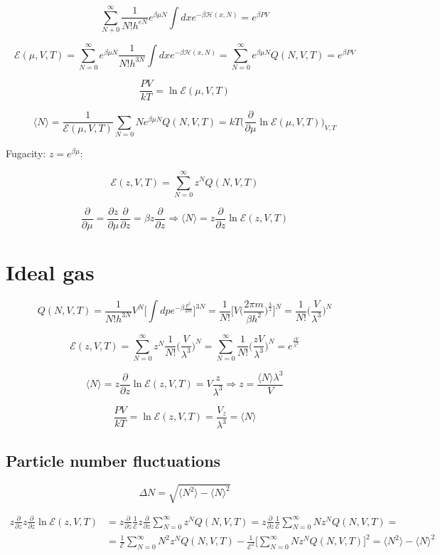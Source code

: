 	$$\sum\limits_{N+0}^{\infty}\frac{1}{N!h^{eN}}e^{\beta\mu N}\int dxe^{-\beta\mathcal{H}(x, N)} = e^{\beta PV}$$

	$$\mathcal{E}(\mu, V, T) = \sum\limits_{N=0}^{\infty}e^{\beta\mu N}\frac{1}{N!h^{3N}}\int dxe^{-\beta\mathcal{H}(x, N)} = \sum\limits_{N=0}^{\infty}e^{\beta\mu N}Q(N, V, T) = e^{\beta PV}$$

	$$\frac{PV}{kT} = \ln\mathcal{E}(\mu, V, T)$$

	$$\langle N\rangle = \frac{1}{\mathcal{E}(\mu, V, T)}\sum\limits_{N=0}Ne^{\beta\mu N}Q(N, V, T) = kT\biggl(\frac{\partial}{\partial\mu}\ln\mathcal{E}(\mu, V, T)\biggr)_{V, T}$$

	Fugacity: $z = e^{\beta\mu}$:

	$$\mathcal{E}(z, V, T) = \sum\limits_{N=0}^{\infty}z^NQ(N, V, T)$$

	$$\frac{\partial}{\partial\mu} = \frac{\partial z}{\partial\mu}\frac{\partial}{\partial z} = \beta z\frac{\partial}{\partial z}\Rightarrow\langle N\rangle = z\frac{\partial}{\partial z}\ln\mathcal{E}(z, V, T)$$

\section{Ideal gas}

$$Q(N, V, T) = \frac{1}{N!h^{3N}}V^N\biggl[\int dpe^{-\beta\frac{p^2}{2m}}\biggr]^{3N} = \frac{1}{N!}\biggl[V\biggl(\frac{2\pi m}{\beta h^2}\biggr)^{\frac{3}{2}}\biggr]^{N} = \frac{1}{N!}\biggl(\frac{V}{\lambda^3}\biggr)^N$$

$$\mathcal{E}(z, V, T) = \sum\limits_{N=0}^{\infty}z^N\frac{1}{N!}\biggl(\frac{V}{\lambda^3}\biggr)^{N} = \sum\limits_{N=0}^{\infty}\frac{1}{N!}\biggl(\frac{zV}{\lambda^3}\biggr)^{N} = e^{\frac{zV}{\lambda^3}}$$

$$\langle N\rangle = z\frac{\partial}{\partial z}\ln\mathcal{E}(z, V, T) = V\frac{z}{\lambda^3}\Rightarrow z = \frac{\langle N\rangle\lambda^3}{V}$$

$$\frac{PV}{kT} = \ln\mathcal{E}(z, V, T) = \frac{V_z}{\lambda^3}= \langle N\rangle$$

	\subsection{Particle number fluctuations}

	$$\Delta N = \sqrt{\langle N^2\rangle-\langle N\rangle^2}$$

	\begin{align*}
		z\frac{\partial}{\partial z}z\frac{\partial}{\partial z}\ln\mathcal{E}(z, V, T) &= z\frac{\partial}{\partial z}\frac{1}{\mathcal{E}}z\frac{\partial}{\partial z}\sum\limits_{N=0}^{\infty}z^NQ(N, V, T) = z\frac{\partial}{\partial z}\frac{1}{\mathcal{E}}\sum\limits_{N=0}^{\infty}Nz^N Q(N, V, T)=\\
																																										&=\frac{1}{\mathcal{E}}\sum\limits_{N=0}^{\infty}N^2z^NQ(N, V, T)-\frac{1}{\mathcal{E}^2}\biggl[\sum\limits_{N=0}^{\infty}Nz^NQ(N, V, T)\biggr]^2 = \langle N^2\rangle - \langle N\rangle^2
	\end{align*}

